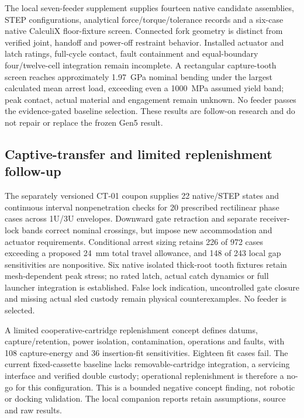 \documentclass[conference]{IEEEtran}
\begin{document}
The local seven-feeder supplement supplies fourteen native candidate assemblies, STEP configurations, analytical force/torque/tolerance records and a six-case native CalculiX floor-fixture screen. Connected fork geometry is distinct from verified joint, handoff and power-off restraint behavior. Installed actuator and latch ratings, full-cycle contact, fault containment and equal-boundary four/twelve-cell integration remain incomplete. A rectangular capture-tooth screen reaches approximately 1.97~GPa nominal bending under the largest calculated mean arrest load, exceeding even a 1000~MPa assumed yield band; peak contact, actual material and engagement remain unknown. No feeder passes the evidence-gated baseline selection. These results are follow-on research and do not repair or replace the frozen Gen5 result.


\subsection{Captive-transfer and limited replenishment follow-up}
The separately versioned CT-01 coupon supplies 22 native/STEP states and continuous interval nonpenetration checks for 20 prescribed rectilinear phase cases across 1U/3U envelopes. Downward gate retraction and separate receiver-lock bands correct nominal crossings, but impose new accommodation and actuator requirements. Conditional arrest sizing retains 226 of 972 cases exceeding a proposed 24~mm total travel allowance, and 148 of 243 local gap sensitivities are nonpositive. Six native isolated thick-root tooth fixtures retain mesh-dependent peak stress; no rated latch, actual catch dynamics or full launcher integration is established. False lock indication, uncontrolled gate closure and missing actual sled custody remain physical counterexamples. No feeder is selected.

A limited cooperative-cartridge replenishment concept defines datums, capture/retention, power isolation, contamination, operations and faults, with 108 capture-energy and 36 insertion-fit sensitivities. Eighteen fit cases fail. The current fixed-cassette baseline lacks removable-cartridge integration, a servicing interface and verified double custody; operational replenishment is therefore a no-go for this configuration. This is a bounded negative concept finding, not robotic or docking validation. The local companion reports retain assumptions, source and raw results.
\end{document}
